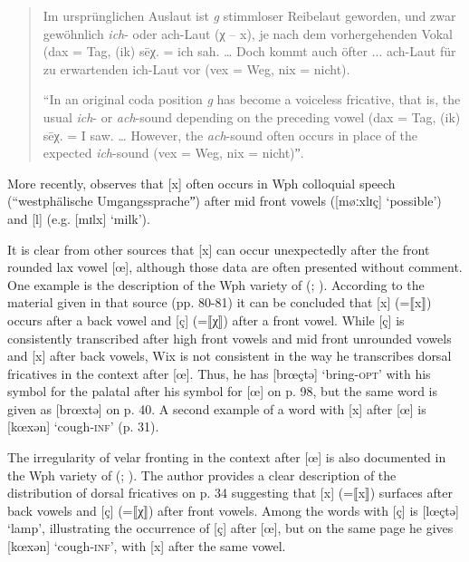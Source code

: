\begin{quote}
  Im ursprünglichen Auslaut ist \textit{g} stimmloser Reibelaut geworden, und zwar gewöhnlich \textit{ich}{}- oder ach-Laut (χ – x), je nach dem vorhergehenden Vokal (dax = Tag, (ik) sēχ. = ich sah. … Doch kommt auch öfter ... ach-Laut für zu erwartenden ich-Laut vor (vex = Weg, nix = nicht).

  “In an original coda position \textit{g} has become a voiceless fricative, that is, the usual \textit{ich}{}- or \textit{ach}{}-sound depending on the preceding vowel (dax = Tag, (ik) sēχ. = I saw. … However, the \textit{ach}{}-sound often occurs in place of the expected \textit{ich}{}-sound (vex = Weg, nix = nicht)ˮ.
\end{quote}

\begin{sloppypar}
More recently, \citet[208]{Lauf1996} observes that [x] often occurs in Wph colloquial speech (“westphälische Umgangsspracheˮ) after mid front vowels ([møːxlɪç] ‘possible’) and [l] (e.g. [mɪlx] ‘milk’).
\end{sloppypar}

It is clear from other sources that [x] can occur unexpectedly after the front rounded lax vowel [œ], although those data are often presented without comment. One example is the description of the Wph variety of  (\citealt{Wix1921}; ). According to the material given in that source (pp. 80-81) it can be concluded that [x] (=⟦x⟧) occurs after a back vowel and [ç] (=⟦χ⟧) after a front vowel. While [ç] is consistently transcribed after high front vowels and mid front unrounded vowels and [x] after back vowels, Wix is not consistent in the way he transcribes dorsal fricatives in the context after [œ]. Thus, he has [brœçtə] ‘bring\textsc{{}-opt}’ with his symbol for the palatal after his symbol for [œ] on p. 98, but the same word is given as [brœxtə] on p. 40. A second example of a word with [x] after [œ] is [kœxən] ‘cough-\textsc{inf}’ (p. 31).

The irregularity of velar fronting in the context after [œ] is also documented in the Wph variety of  (\citealt{Frebel1957}; ). The author provides a clear description of the distribution of dorsal fricatives on p. 34 suggesting that [x] (=⟦x⟧) surfaces after back vowels and [ç] (=⟦χ⟧) after front vowels. Among the words with [ç] is [lœçtə] ‘lamp’, illustrating the occurrence of [ç] after [œ], but on the same page he gives [kœxən] ‘cough\textsc{{}-inf}’, with [x] after the same vowel.


